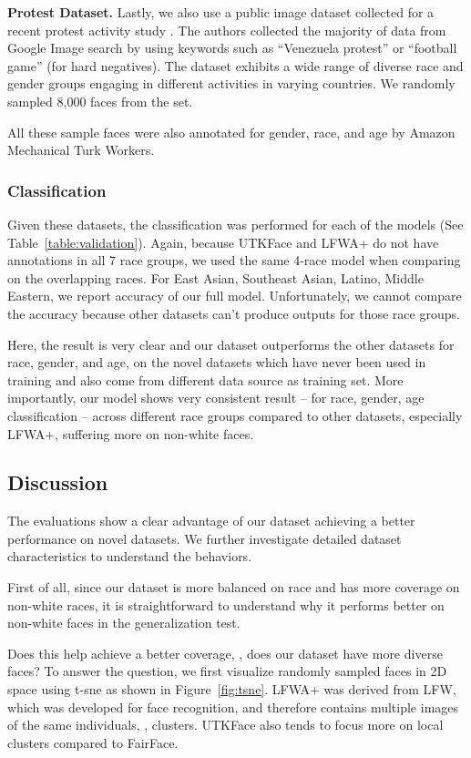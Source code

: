 \textbf{Protest Dataset.} 
Lastly, we also use a public image dataset collected for a recent protest activity study \cite{won2017protest}. The authors collected the majority of data from Google Image search by using keywords such as ``Venezuela protest'' or ``football game'' (for hard negatives). The dataset exhibits a wide range of diverse race and gender groups engaging in different activities in varying countries. We randomly sampled 8,000 faces from the set.

All these sample faces were also annotated for gender, race, and age by Amazon Mechanical Turk Workers. 

\subsubsection{Classification}
Given these datasets, the classification was performed for each of the models (See Table~\ref{table:validation}). Again, because UTKFace and LFWA+ do not have annotations in all 7 race groups, we used the same 4-race model when comparing on the overlapping races. For East Asian, Southeast Asian, Latino, Middle Eastern, we report accuracy of our full model. Unfortunately, we cannot compare the accuracy because other datasets can't produce outputs for those race groups. 

Here, the result is very clear and our dataset outperforms the other datasets for race, gender, and age, on the novel datasets which have never been used in training and also come from different data source as training set. More importantly, our model shows very consistent result -- for race, gender, age classification -- across different race groups compared to other datasets, especially LFWA+, suffering more on non-white faces. 


\subsection{Discussion}
The evaluations show a clear advantage of our dataset achieving a better performance on novel datasets. We further investigate detailed dataset characteristics to understand the behaviors. 

First of all, since our dataset is more balanced on race and has more coverage on non-white races, it is straightforward to understand why it performs better on non-white faces in the generalization test. 

Does this help achieve a better coverage, \ie, does our dataset have more diverse faces? To answer the question, we first visualize randomly sampled faces in 2D space using t-sne \cite{maaten2008visualizing} as shown in Figure~\ref{fig:tsne}. LFWA+ was derived from LFW, which was developed for face recognition, and therefore contains multiple images of the same individuals, \ie, clusters. UTKFace also tends to focus more on local clusters compared to FairFace. 


